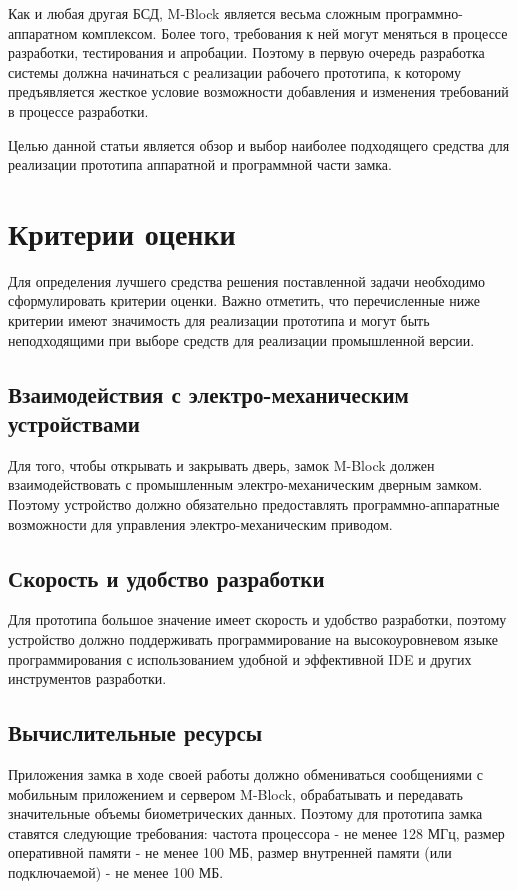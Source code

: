 \documentclass[twoside,a4paper]{msmb} %
\begin{document}
Как и любая другая БСД, M-Block является весьма сложным программно-аппаратном комплексом. Более того,  требования к ней могут меняться в процессе разработки, тестирования и апробации. Поэтому в первую очередь разработка системы должна начинаться  с реализации рабочего прототипа, к которому предъявляется жесткое условие возможности добавления и изменения требований в процессе разработки.

Целью данной статьи является обзор и выбор наиболее подходящего средства для реализации прототипа аппаратной и программной части замка.

\section{Критерии оценки}
Для определения лучшего средства решения поставленной задачи необходимо сформулировать критерии оценки. Важно отметить, что перечисленные ниже критерии имеют значимость для реализации прототипа и могут быть неподходящими при выборе средств для реализации промышленной версии.

\subsection{Взаимодействия с электро-механическим устройствами}
Для того, чтобы открывать и закрывать дверь, замок M-Block должен взаимодействовать с промышленным электро-механическим дверным замком. Поэтому устройство должно обязательно предоставлять программно-аппаратные возможности для управления электро-механическим приводом.

\subsection{Скорость и удобство разработки}
Для прототипа большое значение имеет скорость и удобство разработки, поэтому устройство должно поддерживать программирование на высокоуровневом языке программирования с использованием удобной и эффективной IDE и других инструментов разработки.

\subsection{Вычислительные ресурсы}
Приложения замка в ходе своей работы должно обмениваться сообщениями с мобильным приложением и сервером M-Block, обрабатывать и передавать значительные объемы биометрических данных. Поэтому для прототипа замка ставятся следующие требования: частота процессора - не менее 128 МГц, размер оперативной памяти - не менее 100 МБ, размер внутренней памяти (или подключаемой) - не менее 100 МБ.
\end{document}
